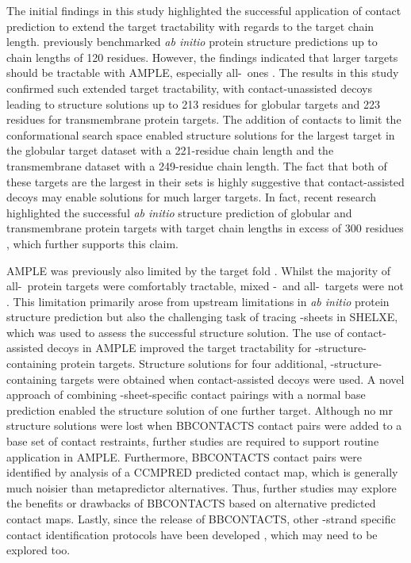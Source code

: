 The initial findings in this study highlighted the successful application of contact prediction to extend the target tractability with regards to the target chain length. \textcite{Bibby2012-lm} previously benchmarked \textit{ab initio} protein structure predictions up to chain lengths of 120 residues. However, the findings indicated that larger targets should be tractable with AMPLE, especially all-\textalpha\ ones \cite{Bibby2012-lm}. The results in this study confirmed such extended target tractability, with contact-unassisted decoys leading to structure solutions up to 213 residues for globular targets and 223 residues for transmembrane protein targets. The addition of contacts to limit the conformational search space enabled structure solutions for the largest target in the globular target dataset with a 221-residue chain length and the transmembrane dataset with a 249-residue chain length. The fact that both of these targets are the largest in their sets is highly suggestive that contact-assisted decoys may enable solutions for much larger targets. In fact, recent research highlighted the successful \textit{ab initio} structure prediction of globular and transmembrane protein targets with target chain lengths in excess of 300 residues \cite{Ovchinnikov2017-nd}, which further supports this claim.

AMPLE was previously also limited by the target fold \cite{Bibby2012-lm}. Whilst the majority of all-\textalpha\ protein targets were comfortably tractable, mixed \textalpha-\textbeta\ and all-\textbeta\ targets were not \cite{Bibby2012-lm}. This limitation primarily arose from upstream limitations in \textit{ab initio} protein structure prediction but also the challenging task of tracing \textbeta-sheets in SHELXE, which was used to assess the successful structure solution. The use of contact-assisted decoys in AMPLE improved the target tractability for \textbeta-structure-containing protein targets. Structure solutions for four additional, \textbeta-structure-containing targets were obtained when contact-assisted decoys were used. A novel approach of combining \textbeta-sheet-specific contact pairings with a normal base prediction enabled the structure solution of one further target. Although no \gls{mr} structure solutions were lost when BBCONTACTS contact pairs were added to a base set of contact restraints, further studies are required to support routine application in AMPLE. Furthermore, BBCONTACTS contact pairs were identified by analysis of a CCMPRED predicted contact map, which is generally much noisier than metapredictor alternatives. Thus, further studies may explore the benefits or drawbacks of BBCONTACTS based on alternative predicted contact maps. Lastly, since the release of BBCONTACTS, other \textbeta-strand specific contact identification protocols have been developed \cite{Mao2018-mo}, which may need to be explored too.

